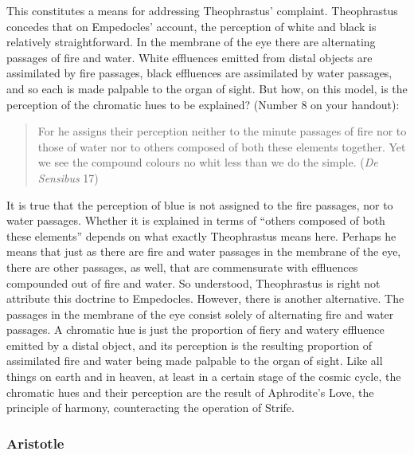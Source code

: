 This constitutes a means for addressing Theophrastus' complaint. Theo\-phrastus concedes that on Empedocles' account, the perception of white and black is relatively straightforward. In the membrane of the eye there are alternating passages of fire and water. White effluences emitted from distal objects are assimilated by fire passages, black effluences are assimilated by water passages, and so each is made palpable to the organ of sight. But how, on this model, is the perception of the chromatic hues to be explained? (Number 8 on your handout):
\begin{quote}
	For he assigns their perception neither to the minute passages of fire nor to those of water nor to others composed of both these elements together. Yet we see the compound colours no whit less than we do the simple. (\emph{De Sensibus} 17)
\end{quote}

It is true that the perception of blue is not assigned to the fire passages, nor to water passages. Whether it is explained in terms of ``others composed of both these elements'' depends on what exactly Theophrastus means here. Perhaps he means that just as there are fire and water passages in the membrane of the eye, there are other passages, as well, that are commensurate with effluences compounded out of fire and water. So understood, Theophrastus is right not attribute this doctrine to Empedocles. However, there is another alternative. The passages in the membrane of the eye consist solely of alternating fire and water passages. A chromatic hue is just the proportion of fiery and watery effluence emitted by a distal object, and its perception is the resulting proportion of assimilated fire and water being made palpable to the organ of sight. Like all things on earth and in heaven, at least in a certain stage of the cosmic cycle, the chromatic hues and their perception are the result of Aphrodite's Love, the principle of harmony, counteracting the operation of Strife. \change

\begin{frame}[t]\frametitle{Aristotle}
	
\end{frame}

